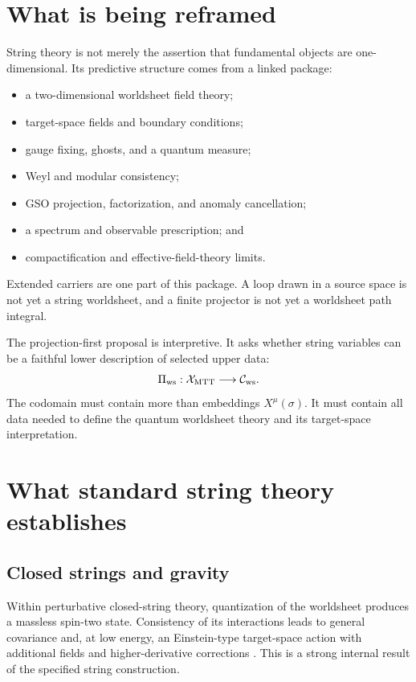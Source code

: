 \documentclass[11pt]{article}
\begin{document}
\tableofcontents

\section{What is being reframed}

String theory is not merely the assertion that fundamental objects are
one-dimensional. Its predictive structure comes from a linked package:
\begin{itemize}[leftmargin=*]
\item a two-dimensional worldsheet field theory;
\item target-space fields and boundary conditions;
\item gauge fixing, ghosts, and a quantum measure;
\item Weyl and modular consistency;
\item GSO projection, factorization, and anomaly cancellation;
\item a spectrum and observable prescription; and
\item compactification and effective-field-theory limits.
\end{itemize}
Extended carriers are one part of this package. A loop drawn in a source
space is not yet a string worldsheet, and a finite projector is not yet a
worldsheet path integral.

The projection-first proposal is interpretive. It asks whether string
variables can be a faithful lower description of selected upper data:
\[
 \Pi_{\rm ws}:\mathcal X_{\rm MTT}
 \longrightarrow
 \mathcal C_{\rm ws}.
\]
The codomain must contain more than embeddings \(X^\mu(\sigma)\). It must
contain all data needed to define the quantum worldsheet theory and its
target-space interpretation.

\section{What standard string theory establishes}

\subsection{Closed strings and gravity}

Within perturbative closed-string theory, quantization of the worldsheet
produces a massless spin-two state. Consistency of its interactions leads to
general covariance and, at low energy, an Einstein-type target-space action
with additional fields and higher-derivative corrections
\cite{GSW,Polchinski1}. This is a strong internal result of the specified
string construction.
\end{document}

